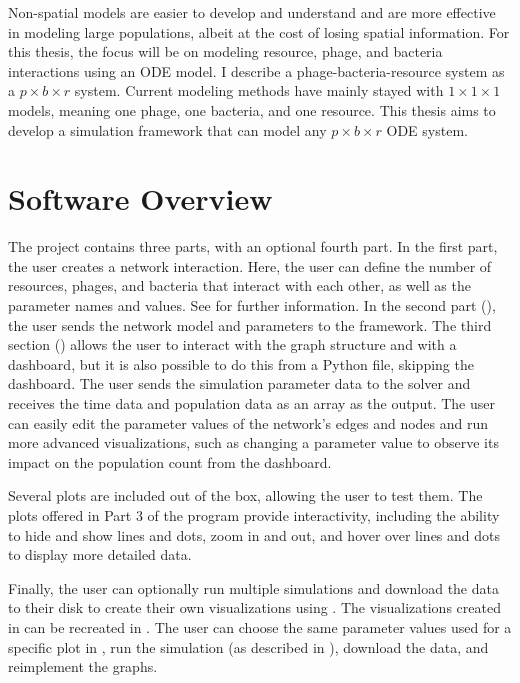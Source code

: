 Non-spatial models are easier to develop and understand and are more effective in modeling large populations, albeit at the cost of losing spatial information. 
For this thesis, the focus will be on modeling resource, phage, and bacteria interactions using an ODE model. 
I describe a phage-bacteria-resource system as a $ p\times b\times r$ system. 
Current modeling methods have mainly stayed with $1\times 1 \times 1$ models, meaning one phage, one bacteria, and one resource. 
This thesis aims to develop a simulation framework that can model any $p\times b \times r$ ODE system. 

\section{Software Overview}
The project contains three parts, with an optional fourth part.
In the first part, the user creates a network interaction. 
Here, the user can define the number of resources, phages, and bacteria that interact with each other, as well as the parameter names and values. See  for further information. 
In the second part (), the user sends the network model and parameters to the framework. 
The third section () allows the user to interact with the graph structure  and  with a dashboard, but it is also possible to do this from a Python file, skipping the dashboard. 
The user sends the simulation parameter data to the solver and receives the time data and population data as an array as the output. 
The user can easily edit the parameter values of the network’s edges and nodes and run more advanced visualizations, such as changing a parameter value to observe its impact on the population count from the dashboard. 

Several plots are included out of the box, allowing the user to test them. 
The plots offered in Part 3 of the program provide interactivity, including the ability to hide and show lines and dots, zoom in and out, and hover over lines and dots to display more detailed data. 

Finally, the user can optionally run multiple simulations and download the data to their disk to create their own visualizations using . 
The visualizations created in  can be recreated in . 
The user can choose the same parameter values used for a specific plot in , run the simulation (as described in ), download the data, and reimplement the graphs. 
